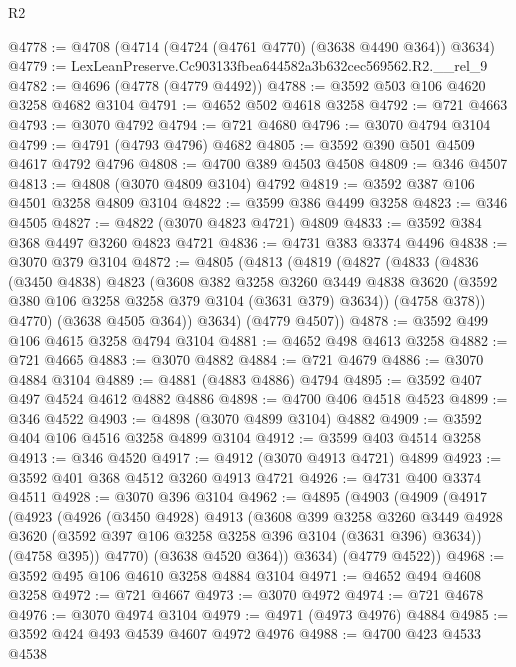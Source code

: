 \begin{lexlean}{R2}
\begin{coremodule}
@4778 := @4708 (@4714 (@4724 (@4761 @4770) (@3638 @4490 @364)) @3634)
@4779 := LexLeanPreserve.Cc903133fbea644582a3b632cec569562.R2.__rel_9
@4782 := @4696 (@4778 (@4779 @4492))
@4788 := @3592 @503 @106 @4620 @3258 @4682 @3104
@4791 := @4652 @502 @4618 @3258
@4792 := @721 @4663
@4793 := @3070 @4792
@4794 := @721 @4680
@4796 := @3070 @4794 @3104
@4799 := @4791 (@4793 @4796) @4682
@4805 := @3592 @390 @501 @4509 @4617 @4792 @4796
@4808 := @4700 @389 @4503 @4508
@4809 := @346 @4507
@4813 := @4808 (@3070 @4809 @3104) @4792
@4819 := @3592 @387 @106 @4501 @3258 @4809 @3104
@4822 := @3599 @386 @4499 @3258
@4823 := @346 @4505
@4827 := @4822 (@3070 @4823 @4721) @4809
@4833 := @3592 @384 @368 @4497 @3260 @4823 @4721
@4836 := @4731 @383 @3374 @4496
@4838 := @3070 @379 @3104
@4872 := @4805
    (@4813
      (@4819
        (@4827
          (@4833
            (@4836
              (@3450 @4838)
              @4823
              (@3608
                @382
                @3258
                @3260
                @3449
                @4838
                @3620
                (@3592 @380 @106 @3258 @3258 @379 @3104 (@3631 @379) @3634))
              (@4758 @378))
            @4770)
          (@3638 @4505 @364))
        @3634)
      (@4779 @4507))
@4878 := @3592 @499 @106 @4615 @3258 @4794 @3104
@4881 := @4652 @498 @4613 @3258
@4882 := @721 @4665
@4883 := @3070 @4882
@4884 := @721 @4679
@4886 := @3070 @4884 @3104
@4889 := @4881 (@4883 @4886) @4794
@4895 := @3592 @407 @497 @4524 @4612 @4882 @4886
@4898 := @4700 @406 @4518 @4523
@4899 := @346 @4522
@4903 := @4898 (@3070 @4899 @3104) @4882
@4909 := @3592 @404 @106 @4516 @3258 @4899 @3104
@4912 := @3599 @403 @4514 @3258
@4913 := @346 @4520
@4917 := @4912 (@3070 @4913 @4721) @4899
@4923 := @3592 @401 @368 @4512 @3260 @4913 @4721
@4926 := @4731 @400 @3374 @4511
@4928 := @3070 @396 @3104
@4962 := @4895
    (@4903
      (@4909
        (@4917
          (@4923
            (@4926
              (@3450 @4928)
              @4913
              (@3608
                @399
                @3258
                @3260
                @3449
                @4928
                @3620
                (@3592 @397 @106 @3258 @3258 @396 @3104 (@3631 @396) @3634))
              (@4758 @395))
            @4770)
          (@3638 @4520 @364))
        @3634)
      (@4779 @4522))
@4968 := @3592 @495 @106 @4610 @3258 @4884 @3104
@4971 := @4652 @494 @4608 @3258
@4972 := @721 @4667
@4973 := @3070 @4972
@4974 := @721 @4678
@4976 := @3070 @4974 @3104
@4979 := @4971 (@4973 @4976) @4884
@4985 := @3592 @424 @493 @4539 @4607 @4972 @4976
@4988 := @4700 @423 @4533 @4538

\end{coremodule}
\end{lexlean}
